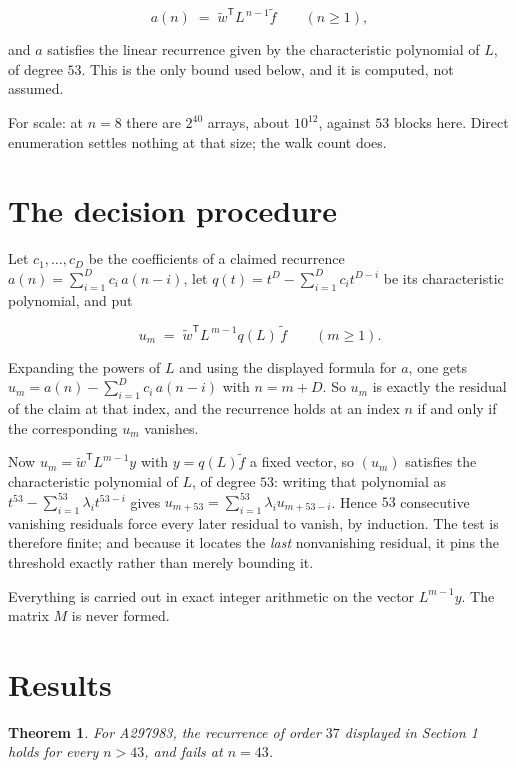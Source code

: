 \documentclass[11pt]{article}
\newtheorem{theorem}{Theorem}
\theoremstyle{definition}
\begin{document}
\[a(n) \;=\; \tilde w^{\mathsf T} L^{\,n-1} \tilde f \qquad (n \ge 1),\]

and $a$ satisfies the linear recurrence given by the characteristic polynomial of $L$, of degree $53$. This is the only bound used below, and it is computed, not assumed.

For scale: at $n = 8$ there are $2^{40}$ arrays, about $10^{12}$, against $53$ blocks here. Direct enumeration settles nothing at that size; the walk count does.

\section{The decision procedure}

Let $c_1,\dots,c_D$ be the coefficients of a claimed recurrence $a(n) = \sum_{i=1}^{D} c_i\,a(n-i)$, let $q(t) = t^{D} - \sum_{i=1}^{D} c_i t^{D-i}$ be its characteristic polynomial, and put

\[u_m \;=\; \tilde w^{\mathsf T} L^{\,m-1} q(L)\,\tilde f \qquad (m \ge 1).\]

Expanding the powers of $L$ and using the displayed formula for $a$, one gets $u_m = a(n) - \sum_{i=1}^{D} c_i\,a(n-i)$ with $n = m + D$. So $u_m$ is exactly the residual of the claim at that index, and the recurrence holds at an index $n$ if and only if the corresponding $u_m$ vanishes.

Now $u_m = \tilde w^{\mathsf T} L^{m-1} y$ with $y = q(L)\tilde f$ a fixed vector, so $(u_m)$ satisfies the characteristic polynomial of $L$, of degree $53$: writing that polynomial as $t^{53} - \sum_{i=1}^{53} \lambda_i t^{53-i}$ gives $u_{m+53} = \sum_{i=1}^{53} \lambda_i u_{m+53-i}$. Hence $53$ consecutive vanishing residuals force every later residual to vanish, by induction. The test is therefore finite; and because it locates the {\itshape last} nonvanishing residual, it pins the threshold exactly rather than merely bounding it.

Everything is carried out in exact integer arithmetic on the vector $L^{m-1}y$. The matrix $M$ is never formed.

\section{Results}

\begin{theorem} For A297983, the recurrence of order $37$ displayed in Section 1 holds for every $n > 43$, and fails at $n = 43$.\end{theorem}
\end{document}
